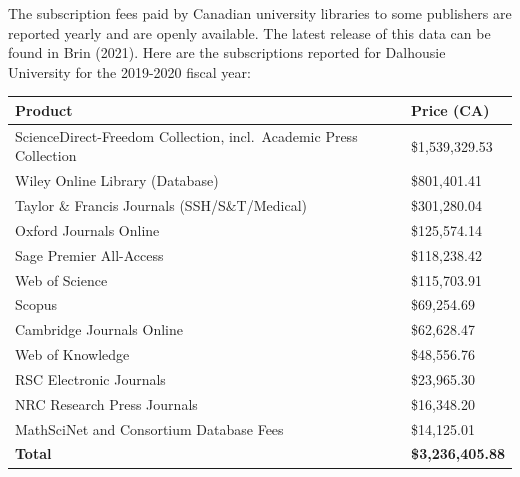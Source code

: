 \documentclass[
  letterpaper,
  DIV=11,
  numbers=noendperiod]{scrreprt}
\newcounter{none} %
\begin{document}
\begin{tcolorbox}[enhanced jigsaw, arc=.35mm, bottomrule=.15mm, bottomtitle=1mm, breakable, colback=white, colbacktitle=quarto-callout-note-color!10!white, colframe=quarto-callout-note-color-frame, coltitle=black, left=2mm, leftrule=.75mm, opacityback=0, opacitybacktitle=0.6, rightrule=.15mm, title=\textcolor{quarto-callout-note-color}{\faInfo}\hspace{0.5em}{The cost of access to scholarly journals in Canada}, titlerule=0mm, toprule=.15mm, toptitle=1mm]

The subscription fees paid by Canadian university libraries to some
publishers are reported yearly and are openly available. The latest
release of this data can be found in Brin (2021). Here are the
subscriptions reported for Dalhousie University for the 2019-2020 fiscal
year:

{\def\LTcaptype{none} %
\begin{longtable}[]{@{}
  >{\raggedright\arraybackslash}p{}
  >{\raggedleft\arraybackslash}p{}@{}}
\toprule\noalign{}
\begin{minipage}[b]{\linewidth}\raggedright
Product
\end{minipage} & \begin{minipage}[b]{\linewidth}\raggedleft
Price (CA)
\end{minipage} \\
\midrule\noalign{}
\endhead
\bottomrule\noalign{}
\endlastfoot
ScienceDirect-Freedom Collection, incl.~Academic Press Collection &
\$1,539,329.53 \\
Wiley Online Library (Database) & \$801,401.41 \\
Taylor \& Francis Journals (SSH/S\&T/Medical) & \$301,280.04 \\
Oxford Journals Online & \$125,574.14 \\
Sage Premier All-Access & \$118,238.42 \\
Web of Science & \$115,703.91 \\
Scopus & \$69,254.69 \\
Cambridge Journals Online & \$62,628.47 \\
Web of Knowledge & \$48,556.76 \\
RSC Electronic Journals & \$23,965.30 \\
NRC Research Press Journals & \$16,348.20 \\
MathSciNet and Consortium Database Fees & \$14,125.01 \\
\textbf{Total} & \textbf{\$3,236,405.88} \\
\end{longtable}
}

\end{tcolorbox}
\end{document}
